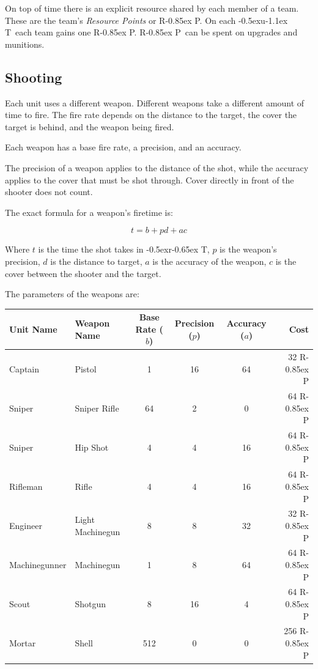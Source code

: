 \documentclass{article}
\newcommand{\UT}{\lower-0.5ex\hbox{u}\kern-1.1ex T}
\newcommand{\RT}{\lower-0.5ex\hbox{r}\kern-0.65ex T}
\newcommand{\RP}{R\kern-0.85ex P}
\begin{document}
On top of time there is an explicit resource shared by each member of a team.
These are the team's \textit{Resource Points} or \RP. On each \UT\ each team
gains one \RP. \RP\ can be spent on upgrades and munitions.

\subsection{Shooting}

Each unit uses a different weapon. Different weapons take a different amount of
time to fire. The fire rate depends on the distance to the target, the cover the
target is behind, and the weapon being fired.

Each weapon has a base fire rate, a precision, and an accuracy.

The precision of a weapon applies to the distance of the shot, while the
accuracy applies to the cover that must be shot through. Cover directly in front
of the shooter does not count.

The exact formula for a weapon's firetime is:

$$t=b+pd+ac$$

Where $t$ is the time the shot takes in \RT, $p$ is the weapon's precision, $d$
is the distance to target, $a$ is the accuracy of the weapon, $c$ is the cover
between the shooter and the target.

The parameters of the weapons are:

\begin{minipage}{\textwidth}
\centering
\begin{tabular}{|l|l|c|c|c|r|}
    \hline
        Unit Name &
        Weapon Name &
        Base Rate ($b$) &
        Precision ($p$) &
        Accuracy ($a$) &
        Cost \\ \hline
    Captain & Pistol & 1 & 16 & 64 & 32 \RP \\ \hline
    Sniper & Sniper Rifle & 64 & 2 & 0 & 64 \RP \\ \hline
    Sniper & Hip Shot & 4 & 4 & 16 & 64 \RP \\ \hline
    Rifleman & Rifle & 4 & 4 & 16 & 64 \RP \\ \hline
    Engineer & Light Machinegun & 8 & 8 & 32 & 32 \RP \\ \hline
    Machinegunner & Machinegun & 1 & 8 & 64 & 64 \RP \\ \hline
    Scout & Shotgun & 8 & 16 & 4 & 64 \RP \\ \hline
    Mortar & Shell & 512 & 0 & 0 & 256 \RP \\ \hline
\end{tabular}
\end{minipage}
\end{document}
